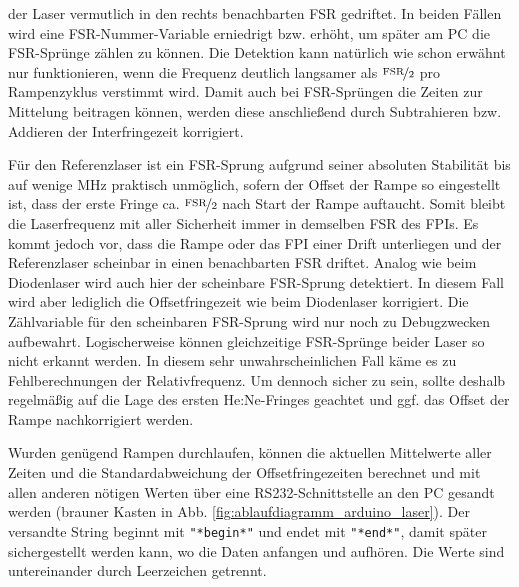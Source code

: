 der Laser vermutlich in den rechts benachbarten FSR gedriftet. In
beiden Fällen wird eine FSR-Nummer-Variable erniedrigt bzw. erhöht, um später am
PC die FSR-Sprünge zählen zu können. Die Detektion kann natürlich wie schon
erwähnt nur funktionieren, wenn die Frequenz deutlich langsamer als
$\nicefrac{\text{FSR}}{2}$ pro Rampenzyklus verstimmt wird. Damit auch bei
FSR-Sprüngen die Zeiten zur Mittelung beitragen können, werden diese
anschließend durch Subtrahieren bzw. Addieren der Interfringezeit korrigiert.\par
Für den Referenzlaser ist ein FSR-Sprung aufgrund seiner absoluten Stabilität
bis auf wenige MHz praktisch unmöglich, sofern der Offset der Rampe so
eingestellt ist, dass der erste Fringe ca.
$\nicefrac{\text{FSR}}{2}$ nach Start der Rampe auftaucht. Somit bleibt die
Laserfrequenz mit aller Sicherheit immer in demselben FSR des FPIs. Es
kommt jedoch vor, dass die Rampe oder das FPI einer Drift unterliegen
und der Referenzlaser scheinbar in einen benachbarten FSR driftet.
Analog wie beim Diodenlaser wird auch hier der scheinbare FSR-Sprung
detektiert. In diesem Fall wird aber lediglich die Offsetfringezeit wie beim
Diodenlaser korrigiert. Die Zählvariable für den scheinbaren FSR-Sprung
wird nur noch zu Debugzwecken aufbewahrt. Logischerweise können
gleichzeitige FSR-Sprünge beider Laser so nicht erkannt werden. In diesem
sehr unwahrscheinlichen Fall käme es zu Fehlberechnungen der Relativfrequenz.
Um dennoch sicher zu sein, sollte deshalb regelmäßig auf die Lage des ersten
He:Ne-Fringes geachtet und ggf. das Offset der Rampe nachkorrigiert werden.\par
Wurden genügend Rampen durchlaufen, können die aktuellen Mittelwerte aller
Zeiten und die Standardabweichung der Offsetfringezeiten berechnet und mit allen
anderen nötigen Werten über eine RS232-Schnittstelle an den PC gesandt werden
(brauner Kasten in Abb.
\ref{fig:ablaufdiagramm_arduino_laser}). Der versandte String beginnt
mit \lstinline|"*begin*"| und endet mit \lstinline|"*end*"|, damit später
sichergestellt werden kann, wo die Daten anfangen und aufhören. Die Werte sind
untereinander durch Leerzeichen getrennt.

